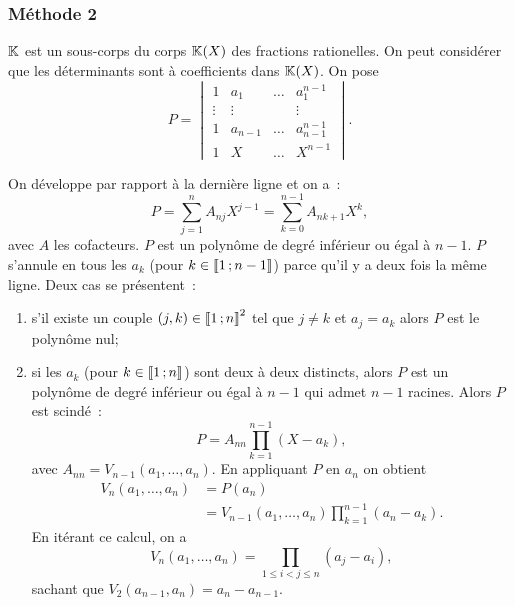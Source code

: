 \subsubsection{Méthode 2}

$\mathbb{K}$ est un sous-corps du corps $\mathbb{K}(X)$ des fractions rationelles. On peut considérer que les déterminants sont à coefficients dans $\mathbb{K}(X)$. On pose
\begin{equation}
  P = 
  \begin{vmatrix}
    1 & a_1 & \ldots & a_1^{n-1} \\
    \vdots & \vdots &  & \vdots \\
    1 & a_{n-1} & \ldots & a_{n-1}^{n-1}\\
    1 & X     & \ldots & X^{n-1}
  \end{vmatrix}.
\end{equation}

On développe par rapport à la dernière ligne et on a~:
\begin{equation}
  P = \sum_{j=1}^n A_{nj} X^{j-1}=\sum_{k=0}^{n-1} A_{n k+1} X^{k},
\end{equation}
avec $A$ les cofacteurs. $P$ est un polynôme de degré inférieur ou égal à $n-1$. $P$ s'annule en tous les $a_k$ (pour $k \in \mathopen{\llbracket}1\mathclose{}\mathpunct{};n-1\mathclose{\rrbracket}$) parce qu'il y a deux fois la même ligne. Deux cas se présentent~:
\begin{enumerate}
\item s'il existe un couple $(j,k) \in \mathopen{\llbracket}1\mathclose{}\mathpunct{};n\mathclose{\rrbracket}^2$ tel que $j \neq k$ et $a_j=a_k$ alors $P$ est le polynôme nul;
\item si les $a_k$ (pour $k \in \mathopen{\llbracket}1\mathclose{}\mathpunct{};n\mathclose{\rrbracket}$) sont deux à deux distincts, alors $P$ est un polynôme de degré inférieur ou égal à $n-1$ qui admet $n-1$ racines. Alors $P$ est scindé~:
  \begin{equation}
    P = A_{nn} \prod_{k=1}^{n-1}(X-a_k),
  \end{equation}
  avec $A_{nn} = V_{n-1}(a_1, \ldots, a_n)$. En appliquant $P$ en $a_n$ on obtient
  \begin{align}
    V_{n}(a_1, \ldots, a_n) &= P(a_n) \\
    &=V_{n-1}(a_1, \ldots, a_n) \prod_{k=1}^{n-1}(a_n-a_k).
  \end{align}
  En itérant ce calcul, on a
  \begin{equation}
    V_{n}(a_1, \ldots, a_n) = \prod_{1 \le i < j \leqslant n} (a_j-a_i),
  \end{equation}
  sachant que $V_2(a_{n-1},a_n)=a_n-a_{n-1}$.
\end{enumerate}

